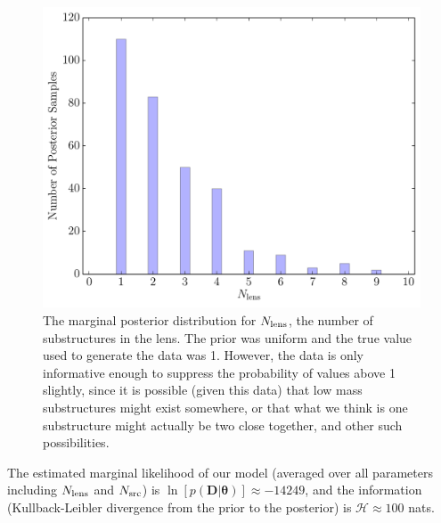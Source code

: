 \documentclass[useAMS,usenatbib]{mn2e}
\begin{document}
\begin{figure}
\begin{center}
\includegraphics[scale=0.4]{N_lens.pdf}
\caption{The marginal posterior distribution for $N_{\rm lens}$, the
number of substructures in the lens. The prior was uniform and the true
value used to generate the data was 1. However, the data is only informative
enough to suppress the probability of values above 1 slightly, since it
is possible (given this data) that low mass substructures might exist somewhere,
or that what we think is one substructure might actually be two close together,
and other such possibilities.
\label{fig:N_lens}}
\end{center}
\end{figure}

The estimated marginal likelihood of our model
(averaged over all parameters including $N_{\rm lens}$ and $N_{\rm src}$)
is
$\ln\left[p(\boldsymbol{D} | \boldsymbol{\theta})\right] \approx -14249$, and
the information (Kullback-Leibler divergence from the prior to the posterior)
is $\mathcal{H} \approx 100$ nats.
\end{document}

